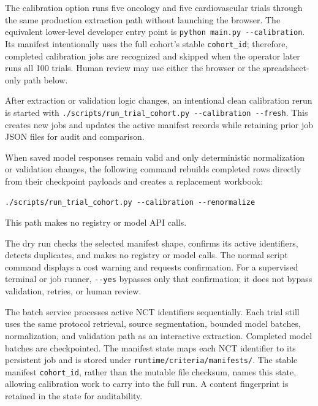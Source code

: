 \documentclass[11pt]{article}
\newcommand{\code}[1]{\nolinkurl{#1}}
\begin{document}
The calibration option runs five oncology and five cardiovascular trials through the same production extraction path without launching the browser. The equivalent lower-level developer entry point is \code{python main.py --calibration}. Its manifest intentionally uses the full cohort's stable \code{cohort_id}; therefore, completed calibration jobs are recognized and skipped when the operator later runs all 100 trials. Human review may use either the browser or the spreadsheet-only path below.

After extraction or validation logic changes, an intentional clean calibration rerun is started with \code{./scripts/run\_trial\_cohort.py --calibration --fresh}. This creates new jobs and updates the active manifest records while retaining prior job JSON files for audit and comparison.

When saved model responses remain valid and only deterministic normalization or validation changes, the following command rebuilds completed rows directly from their checkpoint payloads and creates a replacement workbook:
\begin{verbatim}
./scripts/run_trial_cohort.py --calibration --renormalize
\end{verbatim}
This path makes no registry or model API calls.

The dry run checks the selected manifest shape, confirms its active identifiers, detects duplicates, and makes no registry or model calls. The normal script command displays a cost warning and requests confirmation. For a supervised terminal or job runner, \code{--yes} bypasses only that confirmation; it does not bypass validation, retries, or human review.

The batch service processes active NCT identifiers sequentially. Each trial still uses the same protocol retrieval, source segmentation, bounded model batches, normalization, and validation path as an interactive extraction. Completed model batches are checkpointed. The manifest state maps each NCT identifier to its persistent job and is stored under \code{runtime/criteria/manifests/}. The stable manifest \code{cohort_id}, rather than the mutable file checksum, names this state, allowing calibration work to carry into the full run. A content fingerprint is retained in the state for auditability.
\end{document}
